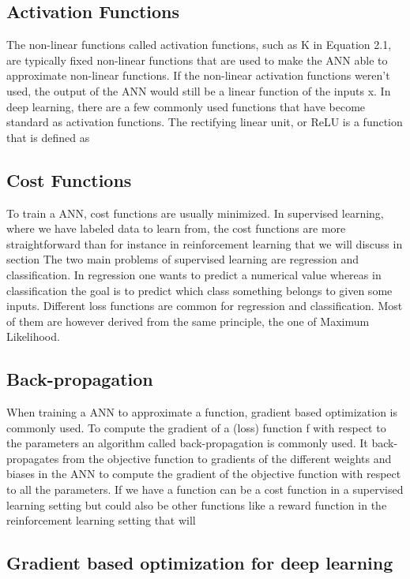 \subsection{Activation Functions}
The non-linear functions called activation functions, such as K in Equation 2.1,
are typically fixed non-linear functions that are used to make the ANN able to
approximate non-linear functions. If the non-linear activation functions weren’t
used, the output of the ANN would still be a linear function of the inputs x. In deep learning, there are a few commonly used functions that
have become standard as activation functions.
The rectifying linear unit, or ReLU is a function that is defined as

\subsection{Cost Functions}
To train a ANN, cost functions are usually minimized. In supervised learning, where we have labeled data to learn from, the cost functions are more
straightforward than for instance in reinforcement learning that we will discuss
in section 
The two main problems of supervised learning are regression and classification.
In regression one wants to predict a numerical value whereas in classification the
goal is to predict which class something belongs to given some inputs. Different
loss functions are common for regression and classification. Most of them are
however derived from the same principle, the one of Maximum Likelihood.

\subsection{Back-propagation}
When training a ANN to approximate a function, gradient based optimization
is commonly used. To compute the gradient of a (loss) function f with
respect to the parameters  an algorithm called back-propagation is commonly
used. It back-propagates from the objective function to gradients of the different
weights and biases in the ANN to compute the gradient of the objective function with respect to all the parameters. If we have a function 
can be a cost function in a supervised learning setting but could also be other
functions like a reward function in the reinforcement learning setting that will

\subsection{Gradient based optimization for deep learning}

